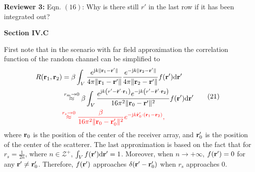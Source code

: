 \documentclass[a4paper,12pt]{article}
\begin{document}
\textbf{Reviewer 3:}
Eqn. $(16)$: Why is there still $r'$ in the last row if it has been integrated out?

{}

\begin{framed}
	{\bf{Section IV.C}}

	\quad  First note that in the scenario with far field approximation the correlation function of the random channel can be simplified to 
	\begin{equation}
		\begin{aligned}
			R({\bf r}_1,{\bf r}_2) &= \beta \int_V \frac{e^{{\rm j}k\| {\bf r}_1-{\bf r}' \|}}{4\pi \|{\bf r}_1-{\bf r}' \|}\frac{e^{-{\rm j}k\| {\bf r}_2-{\bf r}' \|}}{4\pi \|{\bf r}_2-{\bf r}' \|} f({\bf r}'){\rm d}{\bf r}'
			\\& \overset{r_m \rightarrow 0}{\approx} \beta \int_{V} \frac{e^{{\rm j}k \left( r' - \hat{\bf r}'\cdot {\bf r}_1\right)}e^{-{\rm j}k \left( r' - \hat{\bf r}'\cdot {\bf r}_2\right)}}{16\pi^2 \| {\bf r}_0-{\bf r}' \|^2} f({\bf r}'){\rm d}{\bf r}'
			\\& \color{red}{\overset{r_s \rightarrow 0}{\approx} \frac{\beta}{16\pi^2 \| {\bf r}_0-{\bf r}'_0 \|^2} e^{-{\rm j}k \hat{\bf r}'_0 \cdot ({\bf r}_1-{\bf r}_2)},}
		\end{aligned}
		\tag{21}
		\label{equ_far_approx}
	\end{equation}
	where ${\bf r}_0$ is the position of the center of the receiver array, {\color{red}and ${\bf r}'_0$ is the position of the center of the scatterer. The last approximation is based on the fact that for $r_s = \frac{1}{2n}$, where $n\in \mathcal{Z}^+$, $\int_V f({\bf r}'){\rm d}{\bf r}' = 1$. Moreover, when $n\rightarrow +\infty$, $f({\bf r}')=0$ for any ${\bf r}'\neq{\bf r}'_0$. Therefore, $f({\bf r}')$ approaches $\delta({\bf r}'-{\bf r}'_0)$ when $r_s$ approaches 0}.
\end{framed}


{}


\clearpage 
\end{document}
